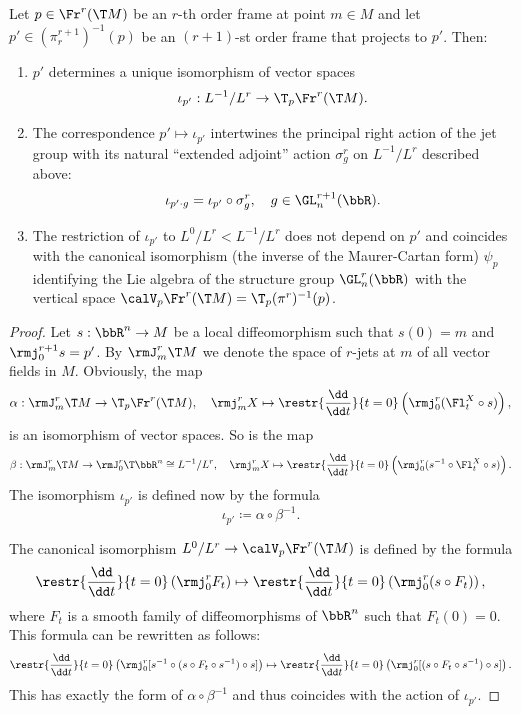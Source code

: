 \begin{prop}\label{prop 8.1 Yuma}
    Let $p\in\Fr^r(\T M)$ be an $r$-th order frame at point $m\in M$ and let $p'\in (\pi^{r+1}_r)^{-1}(p)$ be an $(r+1)$-st order frame that projects to $p'$. Then:
    \begin{enumerate}
        \item $p'$ determines a unique isomorphism of vector spaces 
        \[\iota_{p'}:L^{-1}\slash L^r\to \T_p\Fr^r(\T M).\]
        \item The correspondence $p'\mapsto \iota_{p'}$ intertwines the principal right action of the jet group with its natural ``extended adjoint'' action $\sigma^r_g$ on $L^{-1}\slash L^r$ described above: 
        \[\iota_{p'\cdot g}=\iota_{p'}\circ \sigma^r_g,\quad g\in \GL_n^{r+1}(\bbR).\]
        \item The restriction of $\iota_{p'}$ to $L^0\slash L^r<L^{-1}\slash L^r$ does not depend on $p'$ and coincides with the canonical isomorphism (the inverse of the Maurer-Cartan form) $\psi_p$ identifying the Lie algebra of the structure group $\GL_n^r(\bbR)$ with the vertical space $\calV_p \Fr^r(\T M)=\T_p(\pi^r)^{-1}(p)$.
    \end{enumerate}
\end{prop}
\begin{proof}
    Let $s:\bbR^n\to M$ be a local diffeomorphism such that $s(0)=m$ and $\rmj_0^{r+1}s=p'$. By $\rmJ^r_m\T M$ we denote the space of $r$-jets at $m$ of all vector fields in $M$. Obviously, the map 
    \[\alpha:\rmJ^r_m\T M\to \T_p\Fr^r(\T M),\quad \rmj^r_mX\mapsto \restr{\frac{\dd}{\dd t}}{t=0}\left(\rmj^r_0(\Fl^X_t\circ s)\right),\]
    is an isomorphism of vector spaces. So is the map 
    \[\beta:\rmJ^r_m\T M\to \rmJ^r_0\T\bbR^n\cong L^{-1}\slash L^r,\quad \rmj^r_m X\mapsto \restr{\frac{\dd}{\dd t}}{t=0}\left(\rmj^r_0(s^{-1}\circ \Fl^X_t\circ s)\right).\]
    The isomorphism $\iota_{p'}$ is defined now by the formula 
    \[\iota_{p'}\coloneqq \alpha\circ\beta^{-1}.\]
    
    The canonical isomorphism $L^0\slash L^r\to \calV_p\Fr^r(\T M)$ is defined by the formula 
    \[\restr{\frac{\dd}{\dd t}}{t=0}\left(\rmj^r_0F_t\right)\mapsto \restr{\frac{\dd}{\dd t}}{t=0}\left(\rmj^r_0(s\circ F_t)\right),\]
    where $F_t$ is a smooth family of diffeomorphisms of $\bbR^n$ such that $F_t(0)=0$. This formula can be rewritten as follows:
    \[\restr{\frac{\dd}{\dd t}}{t=0}\left(\rmj^r_0[s^{-1}\circ (s\circ F_t\circ s^{-1})\circ s]\right)\mapsto \restr{\frac{\dd}{\dd t}}{t=0}\left(\rmj^r_0[(s\circ F_t\circ s^{-1})\circ s]\right).\]
    This has exactly the form of $\alpha\circ\beta^{-1}$ and thus coincides with the action of $\iota_{p'}$.
\end{proof}

